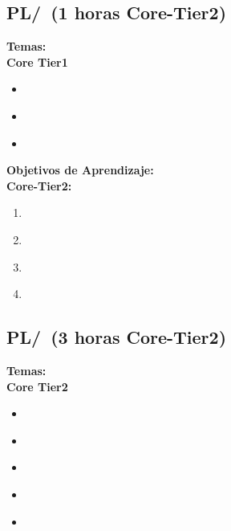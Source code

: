 \subsection{PL/\PLProgramRepresentation~(1 horas Core-Tier2)}\label{sec:BOK:PLProgramRepresentation}
\noindent \textbf{Temas:}\\
\noindent \textbf{Core Tier1}
\begin{itemize}
	\item \PLProgramRepresentationTopicPrograms\label{sec:BOK:PLProgramRepresentationTopicPrograms}
	\item \PLProgramRepresentationTopicAbstract\label{sec:BOK:PLProgramRepresentationTopicAbstract}
	\item \PLProgramRepresentationTopicData\label{sec:BOK:PLProgramRepresentationTopicData}
\end{itemize}


\noindent \textbf{Objetivos de Aprendizaje:}\\
\noindent \textbf{Core-Tier2:}
\begin{enumerate}
	\setcounter{enumi}{0}
	\item \PLProgramRepresentationLOExplainHowProcess\xspace[\PLProgramRepresentationLOExplainHowProcessLevel]\label{sec:BOK:PLProgramRepresentationLOExplainHowProcess}
	\item \PLProgramRepresentationLODescribeAnTree\xspace[\PLProgramRepresentationLODescribeAnTreeLevel]\label{sec:BOK:PLProgramRepresentationLODescribeAnTree}
	\item \PLProgramRepresentationLODescribeTheHaving\xspace[\PLProgramRepresentationLODescribeTheHavingLevel]\label{sec:BOK:PLProgramRepresentationLODescribeTheHaving}
	\item \PLProgramRepresentationLOWriteAProcess\xspace[\PLProgramRepresentationLOWriteAProcessLevel]\label{sec:BOK:PLProgramRepresentationLOWriteAProcess}
\end{enumerate}


\subsection{PL/\PLLanguageTranslationandExecution~(3 horas Core-Tier2)}\label{sec:BOK:PLLanguageTranslationandExecution}
\noindent \textbf{Temas:}\\
\noindent \textbf{Core Tier2}
\begin{itemize}
	\item \PLLanguageTranslationandExecutionTopicInterpretation\label{sec:BOK:PLLanguageTranslationandExecutionTopicInterpretation}
	\item \PLLanguageTranslationandExecutionTopicLanguage\label{sec:BOK:PLLanguageTranslationandExecutionTopicLanguage}
	\item \PLLanguageTranslationandExecutionTopicRun\label{sec:BOK:PLLanguageTranslationandExecutionTopicRun}
	\item \PLLanguageTranslationandExecutionTopicRunTime\label{sec:BOK:PLLanguageTranslationandExecutionTopicRunTime}
	\item \PLLanguageTranslationandExecutionTopicMemory\label{sec:BOK:PLLanguageTranslationandExecutionTopicMemory}
\end{itemize}


